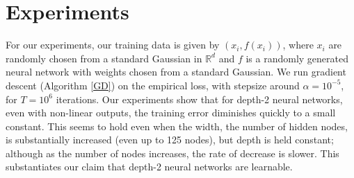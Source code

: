 \documentclass{article}
\newcommand{\R}{{\mathbb{R}}}
\begin{document}
 
\section{Experiments}
\label{experiments}
For our experiments, our training data is given by $(x_i, f(x_i))$, where $x_i$ are randomly chosen from a standard Gaussian in $\R^d$ and $f$ is a randomly generated neural network with weights chosen from a standard Gaussian. We run gradient descent (Algorithm \ref{GD}) on the empirical loss, with stepsize around $\alpha = 10^{-5}$, for $T = 10^6$ iterations. Our experiments show that for depth-2 neural networks, even with non-linear outputs, the training error diminishes quickly to a small constant. This seems to hold even when the width, the number of hidden nodes, is substantially increased (even up to 125 nodes), but depth is held constant; although as the number of nodes increases, the rate of decrease is slower. This substantiates our claim that depth-2 neural networks are learnable.
\end{document}
